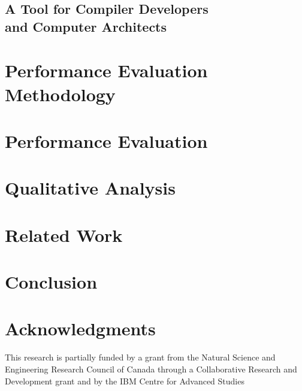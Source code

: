 \documentclass{acm_proc_article-sp}
\begin{document}
	\subsection{A Tool for Compiler Developers\\
	                   and Computer Architects}
		\label{sec:HEPMiner}
		
		
\section{Performance Evaluation\\
              Methodology}
	\label{sec:Methodology}
	

\section{Performance Evaluation}
	\label{sec:PerformanceEvaluation}
	
\section{Qualitative Analysis}
        \label{sec:QualAnalysis}
        
\section{Related Work}
	\label{sec:Related}
	

\section*{Conclusion}
	\label{sec:Conclusion}
	

\section{Acknowledgments}
This research is partially funded by a grant from the Natural Science and Engineering Research Council of Canada through a Collaborative Research and Development grant and by the IBM Centre for Advanced Studies


  
\balancecolumns
\end{document}
